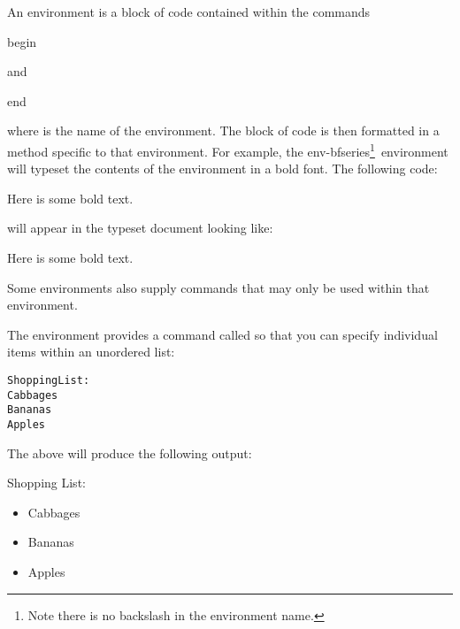 An \gls*{environment} is a block of code contained within the
\glspl{command}
\begin{definition}
\gls{begin}
\end{definition}%
and
\begin{definition}
\gls{end}
\end{definition}%
where  is the
name of the environment.  The block of code is then formatted in a
method specific to that environment.  For example, the
\gls{env-bfseries}\footnote{Note there is no backslash in
the
environment name.}\ environment will typeset the contents of the
environment in a bold font. The following code:
\begin{codeS}
Here is some bold text.
\end{codeS}%
will appear in the typeset document looking like:
\begin{resultS}
\begin{bfseries}Here is some bold text.\end{bfseries}
\end{resultS}

Some environments also supply \glspl{command} that may only be used
within that environment. 

The  environment provides a command called
 so that you can specify individual items within
an unordered list:
\begin{code}
\begin{alltt}
Shopping List:
   Cabbages
   Bananas
   Apples
\end{alltt}
\end{code}%
The above will produce the following output:
\begin{result}
Shopping List:
\begin{itemize}
\item Cabbages
\item Bananas
\item Apples
\end{itemize}
\end{result}
